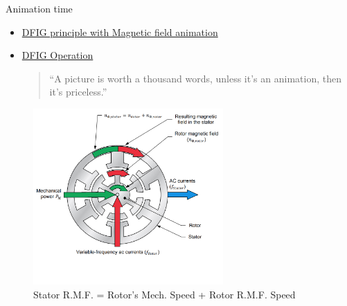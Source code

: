 \documentclass{beamer}
\begin{document}
\begin{frame}{Animation time}
\begin{itemize}
    \item  \href{https://www.pengky.cn/zz-horizontal-axis-turbine/13-doubly-fed-wind-turbine-principle/rotor-magnetic-field.mp4}{DFIG principle with Magnetic field animation}
    

    \item \href{https://www.pengky.cn/zz-horizontal-axis-turbine/13-doubly-fed-wind-turbine-principle/doubly-fed-system.mp4}{DFIG Operation}


\vspace{0.5in}
\begin{quote}
\begin{center}
    
    \textcolor{mbrown}{``A picture is worth a thousand words, unless it’s an animation, then it’s priceless.'' }
    
\end{center}
\end{quote}

\end{itemize}
\end{frame}


\begin{frame}{}
    \begin{figure}
        \centering
        \includegraphics[width=2.85in]{imgs/dfigOP (4).jpg}
        \caption{Stator R.M.F. = Rotor's Mech. Speed + Rotor R.M.F. Speed}
    \end{figure}
\end{frame}
\end{document}
